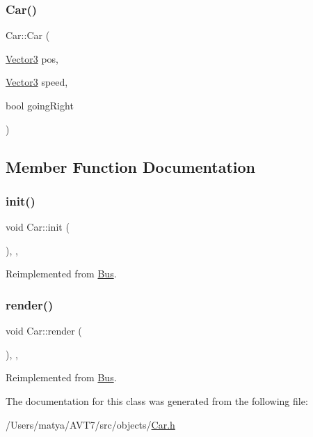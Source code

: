 \subsubsection{\texorpdfstring{Car()}{Car()}}
{\footnotesize\ttfamily Car\+::\+Car (\begin{DoxyParamCaption}\item[{\hyperlink{class_vector3}{Vector3}}]{pos,  }\item[{\hyperlink{class_vector3}{Vector3}}]{speed,  }\item[{bool}]{going\+Right }\end{DoxyParamCaption})\hspace{0.3cm}{\ttfamily [inline]}}



\subsection{Member Function Documentation}
\mbox{\label{class_car_ae7d4da15bf41cc2d36465129372f2a71}} 
\subsubsection{\texorpdfstring{init()}{init()}}
{\footnotesize\ttfamily void Car\+::init (\begin{DoxyParamCaption}{ }\end{DoxyParamCaption})\hspace{0.3cm}{\ttfamily [inline]}, {\ttfamily [override]}, {\ttfamily [virtual]}}



Reimplemented from \hyperlink{class_bus_a7bff316b767441b92f8e82f17a44fbf7}{Bus}.

\mbox{\label{class_car_a52c7156c403d267444de3d4813fffba2}} 
\subsubsection{\texorpdfstring{render()}{render()}}
{\footnotesize\ttfamily void Car\+::render (\begin{DoxyParamCaption}{ }\end{DoxyParamCaption})\hspace{0.3cm}{\ttfamily [inline]}, {\ttfamily [override]}, {\ttfamily [virtual]}}



Reimplemented from \hyperlink{class_bus_a0fe709af4b2ca86583d8647f323c231c}{Bus}.



The documentation for this class was generated from the following file\+:\begin{DoxyCompactItemize}
\item 
/\+Users/matya/\+A\+V\+T7/src/objects/\hyperlink{_car_8h}{Car.\+h}\end{DoxyCompactItemize}
